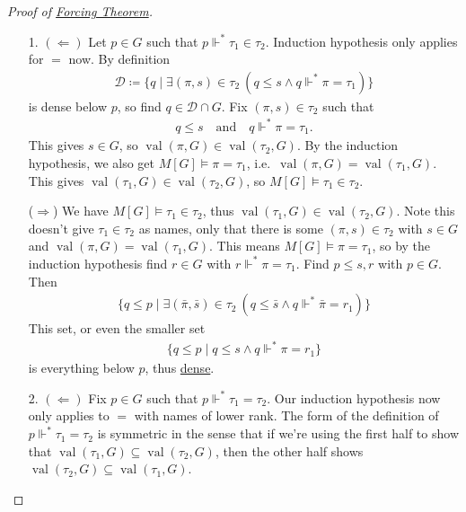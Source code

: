 \documentclass{article}
\newcommand{\1}{\mathbbm{1}}
\DeclareMathOperator{\val}{val}
\let\models\vDash
\let\forces\Vdash
\begin{document}
\begin{proof}[Proof of \hyperlink{thm:forcing}{Forcing Theorem}]
\begin{enumerate}
    \item[1.] $(\Leftarrow)$ Let $p \in G$ such that $p \forces^* \tau_1 \in \tau_2$.
      Induction hypothesis only applies for $=$ now.
      By definition
      \begin{align*}
        \mathcal{D} \coloneqq \{q \mid \exists (\pi,s) \in \tau_2 \ (q \leq s \land q\forces^* \pi = \tau_1)\}
      \end{align*}
      is dense below $p$, so
      find $q \in \mathcal{D} \cap G$.
      Fix $(\pi,s) \in \tau_2$ such that
      \begin{align*}
        q \leq s \quad \text{and} \quad q \forces^* \pi = \tau_1.
      \end{align*}
      This gives $s \in G$, so $\val(\pi,G) \in \val(\tau_2,G)$.
      By the induction hypothesis, we also get $M[G] \models \pi = \tau_1$, i.e.\ $\val(\pi,G) = \val(\tau_1, G)$.
      This gives $\val(\tau_1,G) \in \val(\tau_2,G)$, so $M[G] \models \tau_1 \in \tau_2$.

      \newlec
      ($\Rightarrow$) We have $M[G] \models \tau_1 \in \tau_2$, thus $\val(\tau_1, G) \in \val(\tau_2,G)$.
      Note this doesn't give $\tau_1 \in \tau_2$ as names, only that there is some $(\pi,s) \in \tau_2$ with $s \in G$ and $\val(\pi,G) = \val(\tau_1,G)$.
      This means $M[G] \models \pi = \tau_1$, so by the induction hypothesis find $r \in G$ with $r \forces^* \pi = \tau_1$.
      Find $p \leq s,r$ with $p \in G$. Then
      \begin{align*}
        \{q \leq p \mid \exists(\bar{\pi}, \bar{s}) \in \tau_2 \ (q \leq \bar{s} \land q \forces^* \bar{\pi} = r_1)\}
      \end{align*}
      This set, or even the smaller set
      \begin{align*}
        \{q \leq p \mid q \leq s \land q \forces^* \pi = r_1\}
      \end{align*}
      is everything below $p$, thus \hyperlink{def:dense}{dense}.

    \item[2.] $(\Leftarrow)$ Fix $p \in G$ such that $p \forces^* \tau_1 = \tau_2$. Our induction hypothesis now only applies to $=$ with names of lower rank.
      The form of the definition of $p \forces^* \tau_1 = \tau_2$ is symmetric in the sense that if we're using the first half to show that $\val(\tau_1, G) \subseteq \val(\tau_2,G)$, then the other half shows $\val(\tau_2,G) \subseteq \val(\tau_1,G)$.


\end{enumerate}
\end{proof}
\end{document}
